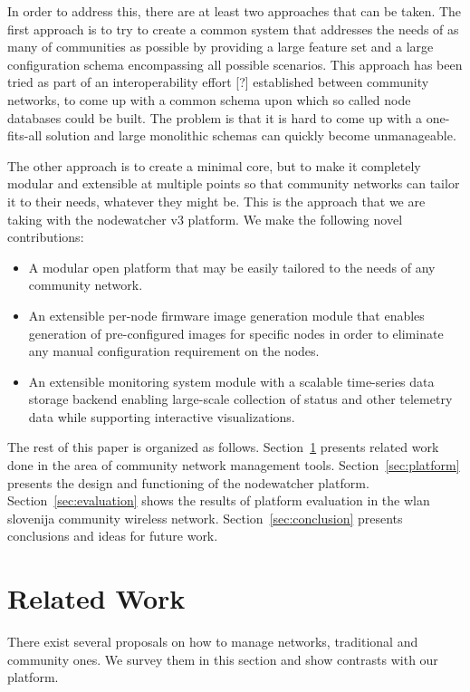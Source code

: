 \documentclass[5p,sort&compress]{elsarticle}
\begin{document}
In order to address this, there are at least two approaches that can be taken. The first approach is to try to create a common system that addresses the needs of as many of communities as possible by providing a large feature set and a large configuration schema encompassing all possible scenarios. This approach has been tried as part of an interoperability effort [?] established between community networks, to come up with a common schema upon which so called node databases could be built. The problem is that it is hard to come up with a one-fits-all solution and large monolithic schemas can quickly become unmanageable.

The other approach is to create a minimal core, but to make it completely modular and extensible at multiple points so that community networks can tailor it to their needs, whatever they might be. This is the approach that we are taking with the nodewatcher v3 platform. We make the following novel contributions:
\begin{itemize}
\item A modular open platform that may be easily tailored to the needs of any community network.
\item An extensible per-node firmware image generation module that enables generation of pre-configured images for specific nodes in order to eliminate any manual configuration requirement on the nodes.
\item An extensible monitoring system module with a scalable time-series data storage backend enabling large-scale collection of status and other telemetry data while supporting interactive visualizations.
\end{itemize}

The rest of this paper is organized as follows. Section~\ref{sec:related-work} presents related work done in the area of community network management tools. Section~\ref{sec:platform} presents the design and functioning of the nodewatcher platform. Section~\ref{sec:evaluation} shows the results of platform evaluation in the wlan slovenija community wireless network. Section~\ref{sec:conclusion} presents conclusions and ideas for future work.

\section{Related Work}
\label{sec:related-work}

There exist several proposals on how to manage networks, traditional and community ones. We survey them in this section and show contrasts with our platform.
\end{document}
